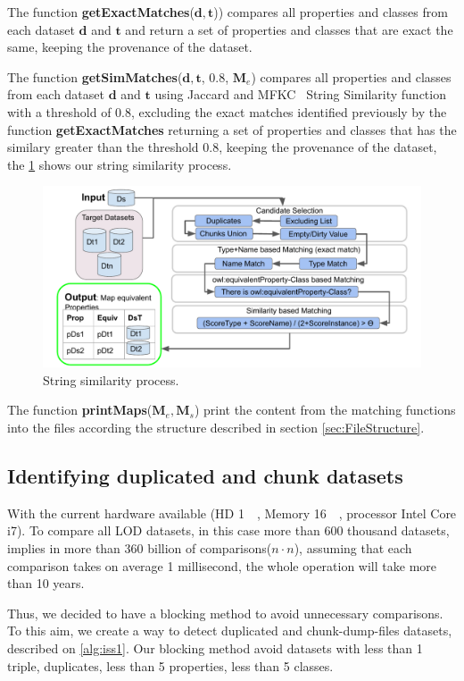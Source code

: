 \documentclass[sw]{iosart2x}
\begin{document}
The function \textbf{getExactMatches}($\mathbf{d},\mathbf{t}$)) compares all properties and classes from each dataset $\mathbf{d}$ and $\mathbf{t}$ and return a set of properties and classes that are exact the same, keeping the provenance of the dataset.

The function \textbf{getSimMatches}($\mathbf{d},\mathbf{t}$, 0.8, $\mathbf{M}_e$) compares all properties and classes from each dataset $\mathbf{d}$ and $\mathbf{t}$ using Jaccard and MFKC~\cite{valdestilhas2017high} String Similarity function with a threshold of 0.8, excluding the exact matches identified previously by the function \textbf{getExactMatches} returning a set of properties and classes that has the similary greater than the threshold 0.8, keeping the provenance of the dataset, the \cref{fig:simMatch} shows our string similarity process.
\begin{figure}[htb] 
	\centering
	\includegraphics[width=0.8\linewidth]{img/stringSim.pdf}
	\caption{String similarity process.}
	\label{fig:simMatch}
\end{figure}

The function \textbf{printMaps}($\mathbf{M}_e, \mathbf{M}_s$) print the content from the matching functions into the files according the structure described in section \ref{sec:FileStructure}.

\subsection{Identifying duplicated and chunk datasets}
\label{sec:duplicates}
With the current hardware available (HD \SI{1}{\tebi\byte}, Memory \SI{16}{\gibi\byte}, processor Intel Core i7).
To compare all LOD datasets, in this case more than 600 thousand datasets, implies in more than 360 billion of comparisons($n \cdot n$), assuming that each comparison takes on average 1 millisecond, the whole operation will take more than 10 years.

Thus, we decided to have a blocking method to avoid unnecessary comparisons. To this aim, we create a way to detect duplicated and chunk-dump-files datasets, described on \cref{alg:iss1}. 
Our blocking method avoid datasets with less than 1 triple, duplicates, less than 5 properties, less than 5 classes.
\end{document}

